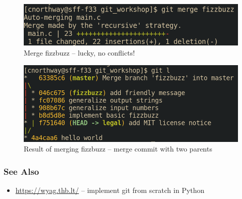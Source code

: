 \documentclass{beamer} \usetheme{Madrid}
\begin{document}
\begin{frame}
    \begin{figure}
        \includegraphics[height=\textwidth-2cm]{ex_imgs/7.png}
        \caption{Merge fizzbuzz -- lucky, no conflicts!}
    \end{figure}
\end{frame}
\begin{frame}
    \begin{figure}
        \includegraphics[height=\textwidth-2cm]{ex_imgs/8.png}
        \caption{Result of merging fizzbuzz -- merge commit with two parents}
    \end{figure}
\end{frame}

\begin{frame}
    \frametitle{See Also}
    \begin{itemize}
        \item \url{https://wyag.thb.lt/} -- implement git from scratch in Python
    \end{itemize}
\end{frame}
\end{document}

